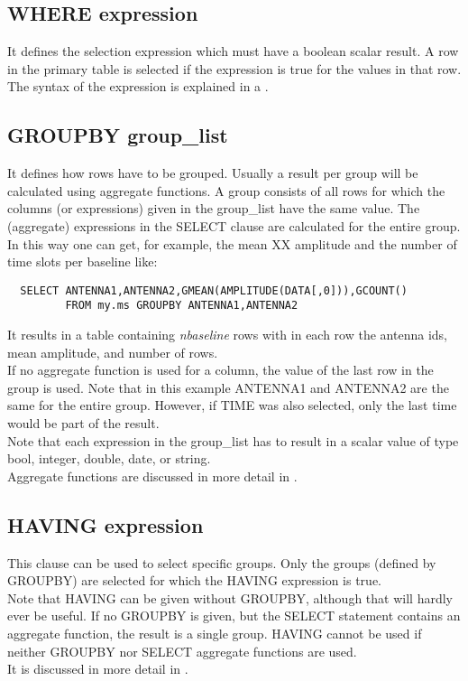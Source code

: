 \subsection{\label{TAQL:WHERE}WHERE expression}
It defines the selection expression which must have a boolean
scalar result. A row in the primary table
is selected if the expression is true for the values in that row.
The syntax of the expression is explained
in a .

\subsection{\label{TAQL:GROUPBY}GROUPBY group\_list}
It defines how rows have to be grouped. Usually a result per group
will be calculated using aggregate functions.
A group consists of all rows for which the columns (or expressions)
given in the group\_list have the same value.
The (aggregate) expressions in the SELECT clause are calculated for
the entire group. In this way one can get, for example, the mean XX amplitude
and the number of time slots per baseline like:
\begin{verbatim}
  SELECT ANTENNA1,ANTENNA2,GMEAN(AMPLITUDE(DATA[,0])),GCOUNT()
         FROM my.ms GROUPBY ANTENNA1,ANTENNA2
\end{verbatim} 
It results in a table containing {\it nbaseline} rows with in each row
the antenna ids, mean amplitude, and number of rows.
\\If no aggregate function is used for a column, the value of the last
row in the group is used. Note that in this example ANTENNA1 and
ANTENNA2 are the same for the entire group. However, if TIME was also
selected, only the last time would be part of the result.
\\Note that each expression in the group\_list has to result in a scalar
value of type bool, integer, double, date, or string.
\\Aggregate functions are discussed in more detail in
. 

\subsection{\label{TAQL:HAVING}HAVING expression}
This clause can be used to select specific groups. Only the groups
(defined by GROUPBY) are selected for which the HAVING 
expression is true. 
\\Note that HAVING can be given without GROUPBY, although that will
hardly ever be useful. If no GROUPBY is given, but the SELECT
statement contains an aggregate function, the result is a single
group.
HAVING cannot be used if neither GROUPBY nor SELECT aggregate
functions are used.
\\It is discussed in more detail in
.

